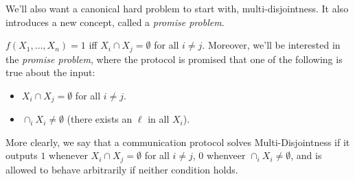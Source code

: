 We'll also want a canonical hard problem to start with, multi-disjointness. It also introduces a new concept, called a \emph{promise problem}.
\begin{Exa} $f(X_1,\ldots, X_n) = 1$ iff $X_i \cap X_j = \emptyset$ for all $i \neq j$. Moreover, we'll be interested in the \emph{promise problem}, where the protocol is promised that one of the following is true about the input:
\begin{itemize}
\item $X_i \cap X_j = \emptyset$ for all $i \neq j$.
\item $\cap_i X_i \neq \emptyset$ (there exists an $\ell$ in all $X_i$). 
\end{itemize}
More clearly, we say that a communication protocol solves Multi-Disjointness if it outputs $1$ whenever $X_i \cap X_j = \emptyset$ for all $i \neq j$, $0$ whenveer $\cap_i X_i \neq \emptyset$, and is allowed to behave arbitrarily if neither condition holds.
\end{Exa}

